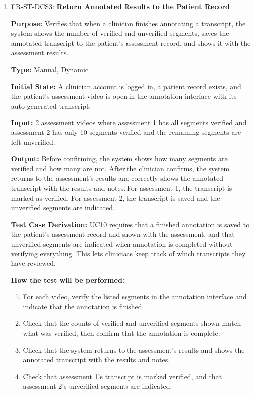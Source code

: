 \documentclass[12pt, titlepage]{article}
\newcommand{\srsuc}[1]{\href{https://github.com/Nour-Fawaz/MacaBoca/blob/main/pdfs/SRS/SRS.pdf}{UC}}
\renewcommand{\_}{\oldunderscore\allowbreak}
\begin{document}
\begin{enumerate}
  \item FR-ST-DCS3: \textbf{Return Annotated Results to the Patient Record\\}
  \begin{mdframed}[linewidth=0.5mm]
      \textbf{Purpose:} Verifies that when a clinician finishes annotating a transcript, the system shows the number of verified and unverified segments, saves the annotated transcript to the patient's assessment record, and shows it with the assessment results.\par
      \textbf{Type:} Manual, Dynamic \par
      \textbf{Initial State:} A clinician account is logged in, a patient record exists, and the patient's assessment video is open in the annotation interface with its auto-generated transcript. \par
      \textbf{Input:} 2 assessment videos where assessment 1 has all segments verified and assessment 2 has only 10 segments verified and the remaining segments are left unverified. \par
      \textbf{Output:} Before confirming, the system shows how many segments are verified and how many are not. After the clinician confirms, the system returns to the assessment's results and correctly shows the annotated transcript with the results and notes. For assessment 1, the transcript is marked as verified. For assessment 2, the transcript is saved and the unverified segments are indicated. \par
      \textbf{Test Case Derivation:} \srsuc*{10} requires that a finished annotation is saved to the patient's assessment record and shown with the assessment, and that unverified segments are indicated when annotation is completed without verifying everything. This lets clinicians keep track of which transcripts they have reviewed. \par
      \textbf{How the test will be performed:}
      \begin{enumerate}
        \item[1.] For each video, verify the listed segments in the annotation interface and indicate that the annotation is finished.
        \item[2.] Check that the counts of verified and unverified segments shown match what was verified, then confirm that the annotation is complete.
        \item[3.] Check that the system returns to the assessment's results and shows the annotated transcript with the results and notes.
        \item[4.] Check that assessment 1's transcript is marked verified, and that assessment 2's unverified segments are indicated.
      \end{enumerate}
  \end{mdframed}


\end{enumerate}
\end{document}
